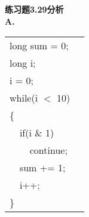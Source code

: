 \documentclass{article}
\begin{document}
\begin{CJK}{UTF8}{gbsn}



\noindent\textbf{练习题3.29分析}	\\
\textbf{A. }	\\[-3ex]
\begin{table}[ht]
\begin{tabular}{m{2em}m{2em}m{2em}l}
	\multicolumn{3}{l}{long sum = 0;}	\\
	\multicolumn{3}{l}{long i;}	\\
	\multicolumn{3}{l}{i = 0;}	\\
	\multicolumn{3}{l}{while(i $<$ 10)}	\\
	\multicolumn{3}{l}{\{}	\\
	&	\multicolumn{2}{l}{if(i \& 1)}	\\
	&	&	continue;	\\
	&	\multicolumn{2}{l}{sum += 1;}	\\
	&	\multicolumn{2}{l}{i++;}	\\
	\multicolumn{3}{l}{\}}	\\
\end{tabular}
\end{table}	\\


\end{CJK}
\end{document}
